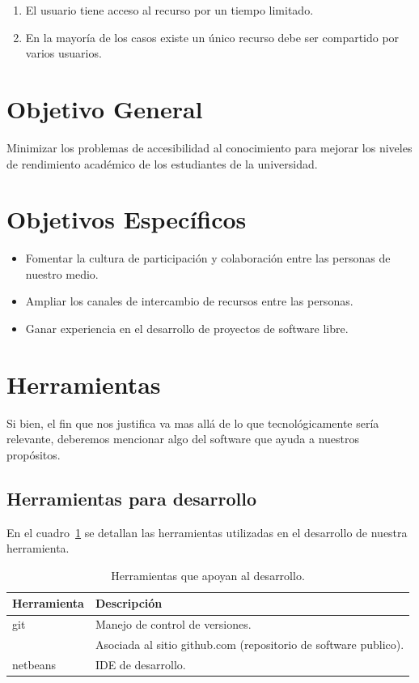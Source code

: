 \documentclass[letter,12pt]{article}
\begin{document}
\begin{enumerate}
\item El usuario tiene acceso al recurso por un tiempo limitado.
\item En la mayoría de los casos existe un único recurso debe ser compartido por varios usuarios.
\end{enumerate} 

\section{Objetivo General}
Minimizar los problemas de accesibilidad al conocimiento para mejorar los niveles de rendimiento
académico de los estudiantes de la universidad.

\section{Objetivos Específicos}
\begin{itemize}
\item Fomentar la cultura de participación y colaboración entre las personas de nuestro medio.
\item Ampliar los canales de intercambio de recursos entre las personas.
\item Ganar experiencia en el desarrollo de proyectos de software libre.
\end{itemize}

\section{Herramientas}
Si bien, el fin que nos justifica va mas allá de lo que tecnológicamente sería relevante, deberemos
mencionar algo del software que ayuda a nuestros propósitos.

\subsection{Herramientas para desarrollo}
En el cuadro~\ref{herramientas_desarrollo} se detallan las herramientas utilizadas en el desarrollo
de nuestra herramienta.

\begin{table}
\begin{tabular}{l|l}
Herramienta & Descripción                                                  \\
\hline
git         & Manejo de control de versiones.                                \\
            & Asociada al sitio github.com (repositorio de software publico). \\
netbeans    & IDE de desarrollo.                                               \\
\end{tabular}
\caption{Herramientas que apoyan al desarrollo.}
\label{herramientas_desarrollo}
\end{table}
\end{document}
